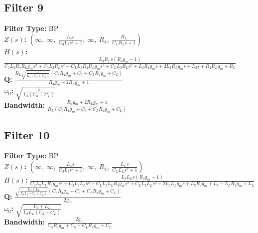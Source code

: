 \documentclass{article}
\begin{document}
\subsection*{Filter 9}
\textbf{Filter Type:} BP \\ 
\textbf{$Z(s)$:} $\left( \infty, \  \infty, \  \frac{L_{3} s}{C_{3} L_{3} s^{2} + 1}, \  \infty, \  R_{4}, \  \frac{R_{L}}{C_{L} R_{L} s + 1}\right)$ \\ 
\textbf{$H(s)$:} $\frac{L_{3} R_{L} s \left(R_{4} g_{m} - 1\right)}{C_{3} L_{3} R_{4} R_{L} g_{m} s^{2} + C_{3} L_{3} R_{L} s^{2} + C_{L} L_{3} R_{4} R_{L} g_{m} s^{2} + C_{L} L_{3} R_{L} s^{2} + L_{3} R_{4} g_{m} s + 2 L_{3} R_{L} g_{m} s + L_{3} s + R_{4} R_{L} g_{m} + R_{L}}$ \\ 
\textbf{Q:} $\frac{R_{L} \sqrt{\frac{1}{L_{3} \left(C_{3} + C_{L}\right)}} \left(C_{3} R_{4} g_{m} + C_{3} + C_{L} R_{4} g_{m} + C_{L}\right)}{R_{4} g_{m} + 2 R_{L} g_{m} + 1}$ \\ 
\textbf{$\omega_0$:} $\sqrt{\frac{1}{L_{3} \left(C_{3} + C_{L}\right)}}$ \\ 
\textbf{Bandwidth:} $\frac{R_{4} g_{m} + 2 R_{L} g_{m} + 1}{R_{L} \left(C_{3} R_{4} g_{m} + C_{3} + C_{L} R_{4} g_{m} + C_{L}\right)}$ \\ 
\subsection*{Filter 10}
\textbf{Filter Type:} BP \\ 
\textbf{$Z(s)$:} $\left( \infty, \  \infty, \  \frac{L_{3} s}{C_{3} L_{3} s^{2} + 1}, \  \infty, \  R_{4}, \  \frac{L_{L} s}{C_{L} L_{L} s^{2} + 1}\right)$ \\ 
\textbf{$H(s)$:} $\frac{L_{3} L_{L} s \left(R_{4} g_{m} - 1\right)}{C_{3} L_{3} L_{L} R_{4} g_{m} s^{2} + C_{3} L_{3} L_{L} s^{2} + C_{L} L_{3} L_{L} R_{4} g_{m} s^{2} + C_{L} L_{3} L_{L} s^{2} + 2 L_{3} L_{L} g_{m} s + L_{3} R_{4} g_{m} + L_{3} + L_{L} R_{4} g_{m} + L_{L}}$ \\ 
\textbf{Q:} $\frac{\sqrt{\frac{L_{3} + L_{L}}{L_{3} L_{L} \left(C_{3} + C_{L}\right)}} \left(C_{3} R_{4} g_{m} + C_{3} + C_{L} R_{4} g_{m} + C_{L}\right)}{2 g_{m}}$ \\ 
\textbf{$\omega_0$:} $\sqrt{\frac{L_{3} + L_{L}}{L_{3} L_{L} \left(C_{3} + C_{L}\right)}}$ \\ 
\textbf{Bandwidth:} $\frac{2 g_{m}}{C_{3} R_{4} g_{m} + C_{3} + C_{L} R_{4} g_{m} + C_{L}}$ \\ 
\end{document}
